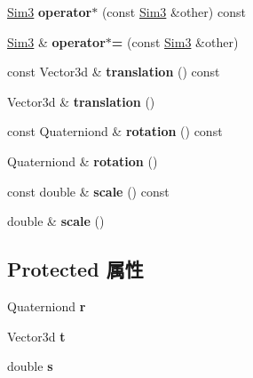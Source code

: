 \begin{DoxyCompactItemize}
\item 
\hypertarget{structg2o_1_1Sim3_adbdfd018f974d1c270450f22a79196de}{\hyperlink{structg2o_1_1Sim3}{Sim3} {\bfseries operator$\ast$} (const \hyperlink{structg2o_1_1Sim3}{Sim3} \&other) const }\label{structg2o_1_1Sim3_adbdfd018f974d1c270450f22a79196de}

\item 
\hypertarget{structg2o_1_1Sim3_aaad597f4a82aef284896be4c6a79aeb9}{\hyperlink{structg2o_1_1Sim3}{Sim3} \& {\bfseries operator$\ast$=} (const \hyperlink{structg2o_1_1Sim3}{Sim3} \&other)}\label{structg2o_1_1Sim3_aaad597f4a82aef284896be4c6a79aeb9}

\item 
\hypertarget{structg2o_1_1Sim3_a0cb517ea637a193e5930f1256a658676}{const Vector3d \& {\bfseries translation} () const }\label{structg2o_1_1Sim3_a0cb517ea637a193e5930f1256a658676}

\item 
\hypertarget{structg2o_1_1Sim3_a1429af2d97c44cd364d748ef07998593}{Vector3d \& {\bfseries translation} ()}\label{structg2o_1_1Sim3_a1429af2d97c44cd364d748ef07998593}

\item 
\hypertarget{structg2o_1_1Sim3_aceefdc87928f521ee0e5bb3f8dc6fb63}{const Quaterniond \& {\bfseries rotation} () const }\label{structg2o_1_1Sim3_aceefdc87928f521ee0e5bb3f8dc6fb63}

\item 
\hypertarget{structg2o_1_1Sim3_a4528a501c958cd71fcc6fdef74db99cc}{Quaterniond \& {\bfseries rotation} ()}\label{structg2o_1_1Sim3_a4528a501c958cd71fcc6fdef74db99cc}

\item 
\hypertarget{structg2o_1_1Sim3_a9988b37acf83f5b6f97fd31024774446}{const double \& {\bfseries scale} () const }\label{structg2o_1_1Sim3_a9988b37acf83f5b6f97fd31024774446}

\item 
\hypertarget{structg2o_1_1Sim3_a062649c3de81c514518e1095c0e49eeb}{double \& {\bfseries scale} ()}\label{structg2o_1_1Sim3_a062649c3de81c514518e1095c0e49eeb}

\end{DoxyCompactItemize}
\subsection*{Protected 属性}
\begin{DoxyCompactItemize}
\item 
\hypertarget{structg2o_1_1Sim3_a55dbe5c6ffe22526f20e05f0c23aa832}{Quaterniond {\bfseries r}}\label{structg2o_1_1Sim3_a55dbe5c6ffe22526f20e05f0c23aa832}

\item 
\hypertarget{structg2o_1_1Sim3_a3ef879fb13b88732428bd2f2a558d11c}{Vector3d {\bfseries t}}\label{structg2o_1_1Sim3_a3ef879fb13b88732428bd2f2a558d11c}

\item 
\hypertarget{structg2o_1_1Sim3_a2cad7c49340494d4bdd28a497e4cb486}{double {\bfseries s}}\label{structg2o_1_1Sim3_a2cad7c49340494d4bdd28a497e4cb486}

\end{DoxyCompactItemize}


